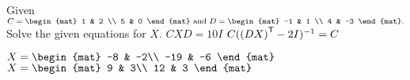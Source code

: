 
\begin{Exercise}[
name={},
title={}, 
difficulty=0,
origin={\cite{YL}}]
Given
$C = \begin{mat}
1 & 2 \\
5 & 0
\end{mat}\text{ and }
D = \begin{mat}
-1 & 1 \\
4 & -3
\end{mat}.
$ Solve the given equations for $X$.
\Question $CXD=10I$
\Question $C({{(DX)}^{\mathsf{T}}}-2I)^{-1}=C$
\end{Exercise}

\begin{Answer}
\begin{multicols}{2}
\Question $
X=
\begin{mat}
-8 & -2\\
-19 & -6
\end{mat}
$
\Question $
X=
\begin{mat}
9 & 3\\
12 & 3
\end{mat}
$
\EndCurrentQuestion
\end{multicols}
\end{Answer}
